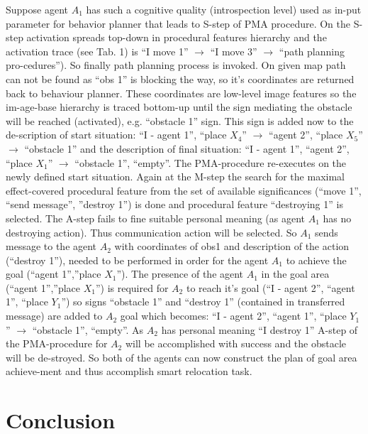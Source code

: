 \documentclass[runningheads,a4paper]{llncs}
\begin{document}
Suppose agent $A_1$ has such a cognitive quality (introspection level) used as in-put parameter for behavior planner that leads to S-step of PMA procedure. On the S-step activation spreads top-down in procedural features hierarchy  and the activation trace (see Tab. 1) is ``I move 1'' $\rightarrow$ ``I move 3'' $\rightarrow$ ``path planning pro-cedures''). So finally path planning process is invoked. On given map path can not be found as ``obs 1'' is blocking the way, so it’s coordinates are returned back to behaviour planner. These coordinates are low-level image features so the im-age-base hierarchy is traced bottom-up until the sign mediating the obstacle will be reached (activated), e.g. ``obstacle 1'' sign. This sign is added now to the de-scription of start situation: ``I - agent 1'', ``place $X_4$'' $\rightarrow$  ``agent 2'', ``place $X_5$'' $\rightarrow$ ``obstacle 1'' and the description of final situation: ``I - agent 1'', ``agent 2'', ``place $X_1$'' $\rightarrow$ ``obstacle 1'', ``empty''. The PMA-procedure re-executes on the newly defined start situation. Again at the M-step the search for the maximal effect-covered procedural feature from the set of available significances (``move 1'', ``send message'', ''destroy 1'') is done and procedural feature ``destroying 1'' is selected. The A-step fails to fine suitable personal meaning (as agent $A_1$ has no destroying action). Thus communication action will be selected. So $A_1$ sends message to the agent $A_2$ with coordinates of obs1 and description of the action (``destroy 1''), needed to be performed in order for the agent $A_1$ to achieve the goal (``agent 1'',''place $X_1$''). The presence of the agent $A_1$ in the goal area (``agent 1'',''place $X_1$'') is required for $A_2$ to reach it’s goal (``I - agent 2'', ``agent 1'', ``place $Y_1$'') so signs ``obstacle 1'' and ``destroy 1'' (contained in transferred message) are added to $A_2$ goal which becomes: ``I - agent 2'', ``agent 1'', ``place $Y_1$'' $\rightarrow$ ``obstacle 1'', ``empty''. As $A_2$ has personal meaning ``I destroy 1'' A-step of the PMA-procedure for $A_2$ will be accomplished with success and the obstacle will be de-stroyed. So both of the agents can now construct the plan of goal area achieve-ment and thus accomplish smart relocation task.

\section{Conclusion}
\end{document}
